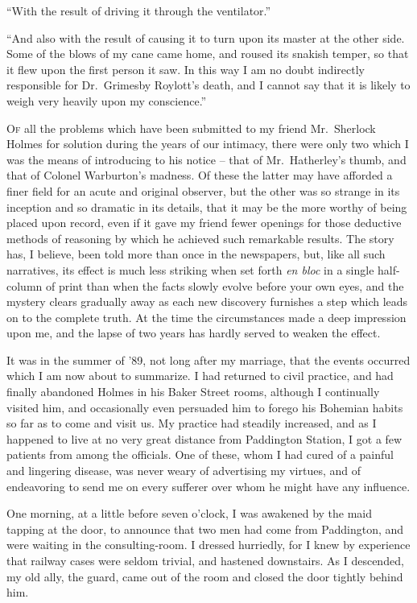 “With the result of driving it through the ventilator.”

“And also with the result of causing it to turn upon its
master at the other side. Some of the blows of my cane
came home, and roused its snakish temper, so that it flew
upon the first person it saw. In this way I am no doubt indirectly
responsible for Dr.\ Grimesby Roylott’s death, and I
cannot say that it is likely to weigh very heavily upon my
conscience.”


\textsc{Of} all the problems which have been submitted to
my friend Mr.~Sherlock Holmes for solution during
the years of our intimacy, there were only
two which I was the means of introducing to his
notice -- that of Mr.~Hatherley’s thumb, and that of Colonel
Warburton’s madness. Of these the latter may have afforded
a finer field for an acute and original observer, but the other
was so strange in its inception and so dramatic in its details,
that it may be the more worthy of being placed upon record,
even if it gave my friend fewer openings for those deductive
methods of reasoning by which he achieved such remarkable
results. The story has, I believe, been told more than once
in the newspapers, but, like all such narratives, its effect is
much less striking when set forth \textit{en bloc} in a single half-%
column of print than when the facts slowly evolve before your
own eyes, and the mystery clears gradually away as each new
discovery furnishes a step which leads on to the complete
truth. At the time the circumstances made a deep impression
upon me, and the lapse of two years has hardly served
to weaken the effect.

It was in the summer of ’89, not long after my marriage,
that the events occurred which I am now about to summarize.
I had returned to civil practice, and had finally abandoned
Holmes in his Baker Street rooms, although I continually
visited him, and occasionally even persuaded him to forego
his Bohemian habits so far as to come and visit us. My practice
had steadily increased, and as I happened to live at no
very great distance from Paddington Station, I got a few
patients from among the officials. One of these, whom I
had cured of a painful and lingering disease, was never
weary of advertising my virtues, and of endeavoring to
send me on every sufferer over whom he might have any
influence.

One morning, at a little before seven o’clock, I was awakened
by the maid tapping at the door, to announce that two
men had come from Paddington, and were waiting in the
consulting-room. I dressed hurriedly, for I knew by experience
that railway cases were seldom trivial, and hastened downstairs.
As I descended, my old ally, the guard, came out of
the room and closed the door tightly behind him.

